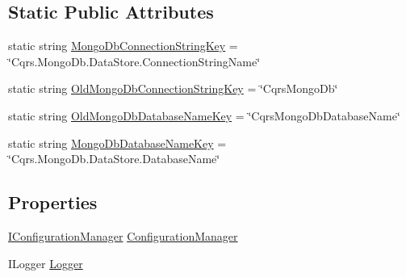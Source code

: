 \subsection*{Static Public Attributes}
\begin{DoxyCompactItemize}
\item 
static string \hyperlink{classCqrs_1_1MongoDB_1_1Factories_1_1MongoDbDataStoreConnectionStringFactory_af6b4a1e2a8dfaa3989ec3c6d0f0803e1_af6b4a1e2a8dfaa3989ec3c6d0f0803e1}{Mongo\+Db\+Connection\+String\+Key} = \char`\"{}Cqrs.\+Mongo\+Db.\+Data\+Store.\+Connection\+String\+Name\char`\"{}
\item 
static string \hyperlink{classCqrs_1_1MongoDB_1_1Factories_1_1MongoDbDataStoreConnectionStringFactory_a6e2233c3a069a805de1e222e4e11b848_a6e2233c3a069a805de1e222e4e11b848}{Old\+Mongo\+Db\+Connection\+String\+Key} = \char`\"{}Cqrs\+Mongo\+Db\char`\"{}
\item 
static string \hyperlink{classCqrs_1_1MongoDB_1_1Factories_1_1MongoDbDataStoreConnectionStringFactory_a91d86af9a5f8eb22a50d1460e084fcea_a91d86af9a5f8eb22a50d1460e084fcea}{Old\+Mongo\+Db\+Database\+Name\+Key} = \char`\"{}Cqrs\+Mongo\+Db\+Database\+Name\char`\"{}
\item 
static string \hyperlink{classCqrs_1_1MongoDB_1_1Factories_1_1MongoDbDataStoreConnectionStringFactory_ae0a5d15a403e61d3ce71a8cdabe01525_ae0a5d15a403e61d3ce71a8cdabe01525}{Mongo\+Db\+Database\+Name\+Key} = \char`\"{}Cqrs.\+Mongo\+Db.\+Data\+Store.\+Database\+Name\char`\"{}
\end{DoxyCompactItemize}
\subsection*{Properties}
\begin{DoxyCompactItemize}
\item 
\hyperlink{interfaceCqrs_1_1Configuration_1_1IConfigurationManager}{I\+Configuration\+Manager} \hyperlink{classCqrs_1_1MongoDB_1_1Factories_1_1MongoDbDataStoreConnectionStringFactory_af39bf5809bdffc1499a995ac1769831a_af39bf5809bdffc1499a995ac1769831a}{Configuration\+Manager}
\item 
I\+Logger \hyperlink{classCqrs_1_1MongoDB_1_1Factories_1_1MongoDbDataStoreConnectionStringFactory_ab2ebea030cc01719042d338712224f50_ab2ebea030cc01719042d338712224f50}{Logger}
\end{DoxyCompactItemize}


